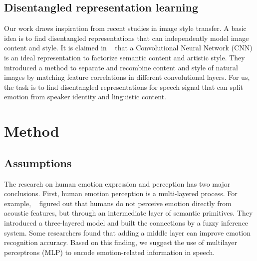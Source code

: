 \documentclass{article}
\begin{document}

\subsection{Disentangled representation learning}
Our work draws inspiration from recent studies in image style transfer. A basic idea is to find disentangled representations that can independently model image content and style. It is claimed in ~\cite{gatys2016image} that a Convolutional Neural Network (CNN) is an ideal representation to factorize semantic content and artistic style. They introduced a method to separate and recombine content and style of natural images by matching feature correlations in different convolutional layers. For us, the task is to find disentangled representations for speech signal that can split emotion from speaker identity and linguistic content.


\section{Method}
\label{sec:method}

\subsection{Assumptions}
The research on human emotion expression and perception has two major conclusions.
First, human emotion perception is a multi-layered process. For example, ~\cite{huang2008three} figured out that humans do not perceive emotion directly from acoustic features, but through an intermediate layer of semantic primitives. They introduced a three-layered model and built the connections by a fuzzy inference system. Some researchers found that adding a middle layer can improve emotion recognition accuracy. Based on this finding, we suggest the use of multilayer perceptrons (MLP) to encode emotion-related information in speech.
\end{document}
